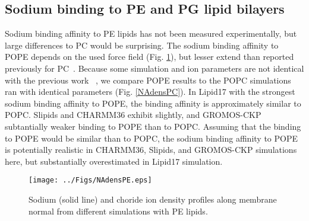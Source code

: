 \documentclass[aps,prl,superscriptaddress,twocolumn]{revtex4}
\begin{document}
\subsection{Sodium binding to PE and PG lipid bilayers}
Sodium binding affinity to PE lipids has not been measured experimentally,
but large differences to PC would be surprising. 
The sodium binding affinity to POPE depends on the used force field (Fig. \ref{NAdensPE}),
but lesser extend than reported previously for PC~\cite{catte16}.
Because some simulation and ion parameters are not identical with the previous work~\cite{catte16}
,
we compare POPE results to the POPC simulations ran with identical parameters (Fig. \ref{NAdensPC}).
In Lipid17 with the strongest sodium binding affinity to POPE,
the binding affinity is approximately similar to POPC.
Slipids and CHARMM36 exhibit slightly, and
GROMOS-CKP subtantially weaker binding to POPE than to POPC.
Assuming that the binding
to POPE would be similar than to POPC, the sodium binding affinity to POPE
is potentially realistic in CHARMM36, Slipids, and GROMOS-CKP simulations here,
but substantially overestimated in Lipid17 simulation.
\begin{figure}[]
  \centering
  \texttt{[image: ../Figs/NAdensPE.eps]}
  \caption{\label{NAdensPE}
    Sodium (solid line) and choride ion density profiles along membrane normal
    from different simulations with PE lipids.
  }
\end{figure}
\end{document}
